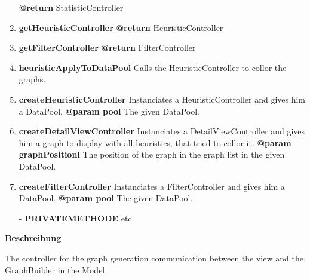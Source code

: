 \begin{enumerate}[+]
{	\textbf{@return} StatisticController \newline
}
	\item{
	\textbf{getHeuristicController} \newline
	\textbf{@return} HeuristicController \newline
}
	\item{
	\textbf{getFilterController} \newline
	\textbf{@return} FilterController \newline
}
	\item{
	\textbf{heuristicApplyToDataPool} \newline
	Calls the HeuristicController to collor the graphs. \newline
}
	\item{
	\textbf{createHeuristicController} \newline
	Instanciates a HeuristicController and gives him a DataPool.
	\textbf{@param pool} The given DataPool. \newline
}
	\item{
	\textbf{createDetailViewController} \newline
	Instanciates a DetailViewController and gives him a graph to display with all heuristics, that tried to collor it.
	\textbf{@param graphPositionl} The position of the graph in the graph list in the given DataPool. \newline
}
	\item{
	\textbf{createFilterController} \newline
	Instanciates a FilterController and gives him a DataPool.
	\textbf{@param pool} The given DataPool. \newline
}

	\item[-]{
		\textbf{PRIVATEMETHODE} etc
	}
\end{enumerate}

\textbf{Beschreibung}

The controller for the graph generation communication between the view and the GraphBuilder in the Model.

